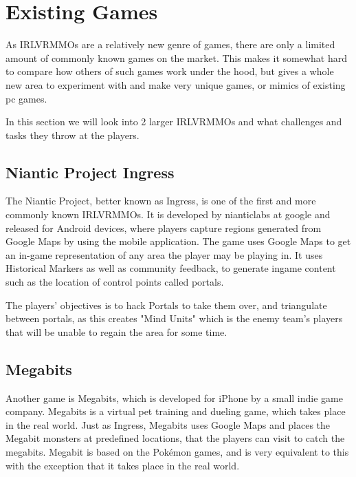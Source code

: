\section{Existing Games}

As IRLVRMMOs are a relatively new genre of games, there are only a limited amount of commonly known games on the market. This makes it somewhat hard to compare how others of such games work under the hood, but gives a whole new area to experiment with and make very unique games, or mimics of existing pc games.

In this section we will look into 2 larger IRLVRMMOs and what challenges and tasks they throw at the players.


\subsection{Niantic Project Ingress}

The Niantic Project, better known as Ingress, is one of the first and more commonly known IRLVRMMOs\cite{ingress:submissions}. It is developed by nianticlabs at google and released for Android devices, where players capture regions generated from Google Maps by using the mobile application. The game uses Google Maps to get an in-game representation of any area the player may be playing in. It uses Historical Markers\cite{ingress:maps} as well as community feedback, to generate ingame content such as the location of control points called portals.

The players' objectives is to hack Portals to take them over, and triangulate between portals, as this creates "Mind Units" which is the enemy team's players that will be unable to regain  the area for some time. 


\subsection{Megabits}

Another game is Megabits\cite{megabits}, which is developed for iPhone by a small indie game company. Megabits is a virtual pet training and dueling game, which takes place in the real world. Just as Ingress, Megabits uses Google Maps and places the Megabit monsters at predefined locations, that the players can visit to catch the megabits. Megabit is based on the Pokémon games, and is very equivalent to this with the exception that it takes place in the real world.


